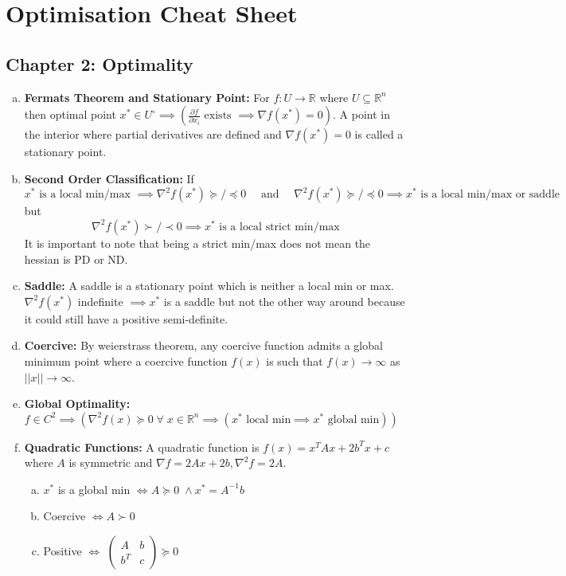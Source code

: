 \documentclass{article}
\begin{document}
\section*{Optimisation Cheat Sheet}

\subsection*{Chapter 2: Optimality}

\begin{enumerate} [a.]
    \item \textbf{Fermats Theorem and Stationary Point:} For \(f: U \to \mathbb{R}\) where \(U \subseteq \mathbb{R}^n\) then  optimal point \(x^* \in U^\circ \implies (\frac{\partial f}{\partial x_i} \text{ exists } \implies \nabla f(x^*)=0)\). A point in the interior where partial derivatives are defined and \(\nabla f(x^*)=0\) is called a stationary point.
    \item \textbf{Second Order Classification:} If 
    \[
    x^* \text{ is a local min/max } \implies \nabla^2f(x^*) \succeq/\preceq 0 \quad \text{ and } \quad \nabla^2f(x^*) \succeq/\preceq 0 \implies x^* \text{ is a local min/max  or saddle}
    \]
    but
    \[
    \nabla^2f(x^*) \succ/\prec 0 \implies x^* \text{ is a local strict min/max}
    \]
    It is important to note that being a strict min/max does not mean the hessian is PD or ND.
    \item \textbf{Saddle:} A saddle is a stationary point which is neither a local min or max. \(\nabla^2f(x^*)\) indefinite \(\implies x^*\) is a saddle but not the other way around because it could still have a positive semi-definite.
    
    \item \textbf{Coercive:} By weierstrass theorem, any coercive function admits a global minimum point where a coercive function \(f(x)\) is such that \(f(x)\to \infty\) as \(||x||\to \infty\).
    
    \item \textbf{Global Optimality:} \(f \in C^2 \implies (\nabla^2f(x)\succeq0 \;\forall\; x \in\mathbb{R}^n \implies (x^* \text{ local min} \implies x^* \text{ global min}))\)

    \item \textbf{Quadratic Functions:} A quadratic function is \(f(x) = x^TAx + 2b^Tx+c\) where \(A\) is symmetric and \(\nabla f= 2Ax + 2b, \nabla^2 f = 2A\).
    \begin{enumerate} [a.]
        \item \(x^*\) is a global min \(\iff A \succeq 0 \;\wedge x^* = A^{-1}b\)
        \item Coercive \(\iff A \succ 0\)
        \item Positive \(\iff\) \(\begin{pmatrix}
            A & b\\
            b^T & c
        \end{pmatrix} \succeq 0\)
    \end{enumerate}
\end{enumerate}
\end{document}
